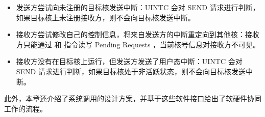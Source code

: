 \begin{itemize}
    \item 发送方尝试向未注册的目标核发送中断：UINTC 会对 SEND 请求进行判断，如果目标核上未注册接收方，则不会向目标核发送中断。
    \item 接收方尝试修改自己的控制信息，将来自发送方的中断重定向到其他核：接收方只能通过 \Iuipiread 和 \Iuipiwrite 指令读写 Pending Requests ，当前核号信息对接收方不可见。
    \item 接收方没有在目标核上运行，但发送方发送了用户态中断：UINTC 会对 SEND 请求进行判断，如果目标核处于非活跃状态，则不会向目标核发送中断。
\end{itemize}

此外，本章还介绍了系统调用的设计方案，并基于这些软件接口给出了软硬件协同工作的流程。